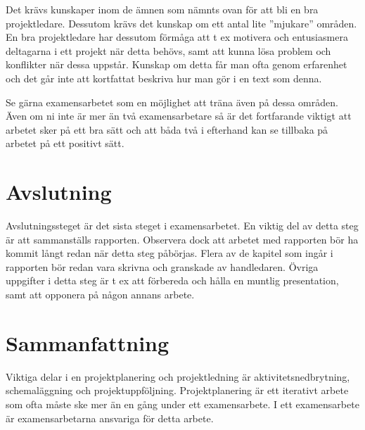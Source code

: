 Det krävs kunskaper inom de ämnen som nämnts ovan för att bli en bra
projektledare. Dessutom krävs det kunskap om ett antal lite ''mjukare''
områden. En bra projektledare har dessutom förmåga att t ex motivera och
entusiasmera deltagarna i ett projekt när detta behövs, samt att kunna
lösa problem och konflikter när dessa uppstår. Kunskap om detta får man
ofta genom erfarenhet och det går inte att kortfattat beskriva hur man
gör i en text som denna.

Se gärna examensarbetet som en möjlighet att träna även på dessa
områden. Även om ni inte är mer än två examensarbetare så är det
fortfarande viktigt att arbetet sker på ett bra sätt och att båda två i
efterhand kan se tillbaka på arbetet på ett positivt sätt.

\section{Avslutning}\label{avslutning}

Avslutningssteget är det sista steget i examensarbetet. En viktig del av
detta steg är att sammanställs rapporten. Observera dock att arbetet med
rapporten bör ha kommit långt redan när detta steg påbörjas. Flera av de
kapitel som ingår i rapporten bör redan vara skrivna och granskade av
handledaren. Övriga uppgifter i detta steg är t ex att förbereda och
hålla en muntlig presentation, samt att opponera på någon annans arbete.

\section{Sammanfattning}\label{sammanfattning}

Viktiga delar i en projektplanering och projektledning är
aktivitetsnedbrytning, schemaläggning och projektuppföljning.
Projektplanering är ett iterativt arbete som ofta måste ske mer än en
gång under ett examensarbete. I ett examensarbete är examensarbetarna
ansvariga för detta arbete.
